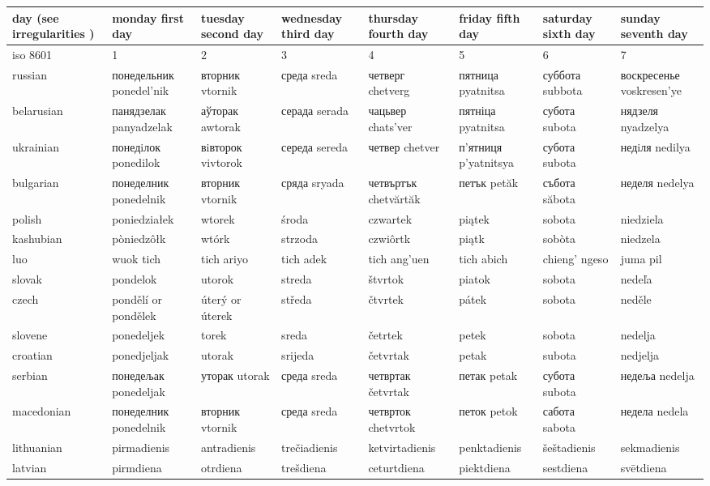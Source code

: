 \documentclass{article}
\begin{document}
\begin{tabular}{llllllll}
\toprule
day (see irregularities ) & monday first day & tuesday second day & wednesday third day & thursday fourth day & friday fifth day & saturday sixth day & sunday seventh day \\
\midrule
iso 8601 & 1 & 2 & 3 & 4 & 5 & 6 & 7 \\
russian & понедельник ponedel'nik & вторник vtornik & среда sreda & четверг chetverg & пятница pyatnitsa & суббота subbota & воскресенье voskresen'ye \\
belarusian & панядзелак panyadzelak & аўторак awtorak & серада serada & чацьвер chats'ver & пятніца pyatnitsa & субота subota & нядзеля nyadzelya \\
ukrainian & понедiлок ponedilok & вiвторок vivtorok & середа sereda & четвер chetver & п'ятниця p'yatnitsya & субота subota & недiля nedilya \\
bulgarian & понеделник ponedelnik & вторник vtornik & сряда sryada & четвъртък chetvărtăk & петък petăk & събота săbota & неделя nedelya \\
polish & poniedziałek & wtorek & środa & czwartek & piątek & sobota & niedziela \\
kashubian & pòniedzôłk & wtórk & strzoda & czwiôrtk & piątk & sobòta & niedzela \\
luo & wuok tich & tich ariyo & tich adek & tich ang'uen & tich abich & chieng' ngeso & juma pil \\
slovak & pondelok & utorok & streda & štvrtok & piatok & sobota & nedeľa \\
czech & pondělí or pondělek & úterý or úterek & středa & čtvrtek & pátek & sobota & neděle \\
slovene & ponedeljek & torek & sreda & četrtek & petek & sobota & nedelja \\
croatian & ponedjeljak & utorak & srijeda & četvrtak & petak & subota & nedjelja \\
serbian & понедељак ponedeljak & уторак utorak & среда sreda & четвртак četvrtak & петак petak & субота subota & недеља nedelja \\
macedonian & понеделник ponedelnik & вторник vtornik & среда sreda & четврток chetvrtok & петок petok & сабота sabota & недела nedela \\
lithuanian & pirmadienis & antradienis & trečiadienis & ketvirtadienis & penktadienis & šeštadienis & sekmadienis \\
latvian & pirmdiena & otrdiena & trešdiena & ceturtdiena & piektdiena & sestdiena & svētdiena \\

\end{tabular}
\end{document}

